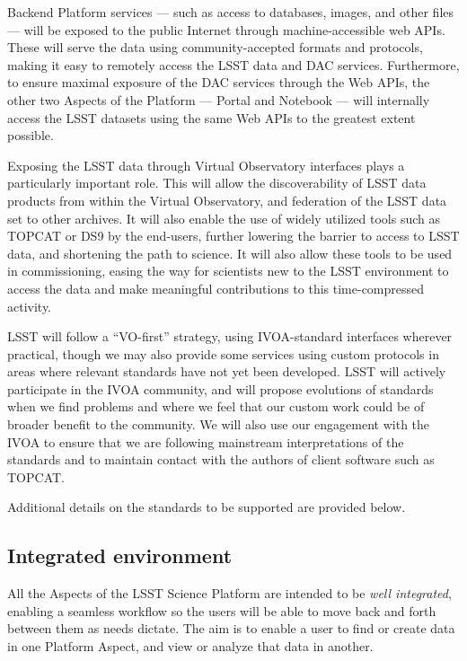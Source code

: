 Backend Platform services --- such as access to
databases, images, and other files --- will be exposed to the public Internet through
machine-accessible web APIs.
These will serve the data using community-accepted
formats and protocols, making it easy to remotely access the LSST data and DAC	
services.
Furthermore, to ensure maximal exposure of the DAC services through the Web APIs,
the other two Aspects of the Platform --- Portal and Notebook --- will
internally access the LSST datasets using the same Web APIs to the greatest extent possible.

Exposing the LSST data through Virtual Observatory interfaces plays a particularly important role.
This will allow the discoverability of LSST data products from within the Virtual Observatory,
and federation of the LSST data set to other archives.
It will also enable the use of widely utilized tools such as TOPCAT or DS9 by the end-users,
further lowering the barrier to access to LSST data, and shortening the path to science.
It will also allow these tools to be used in commissioning,
easing the way for scientists new to the LSST environment to access the data and make meaningful
contributions to this time-compressed activity.

LSST will follow a ``VO-first'' strategy, using IVOA-standard interfaces wherever practical,
though we may also provide some services using custom protocols in areas where relevant standards have not yet been developed.
LSST will actively participate in the IVOA community, and will propose evolutions of standards when we find problems and where we feel that our custom work could be of broader benefit to the community.
We will also use our engagement with the IVOA to ensure that we are following mainstream interpretations of the standards and to maintain contact with the authors of client software such as TOPCAT.

Additional details on the standards to be supported are provided below.

\subsection{Integrated environment}

All the Aspects of the LSST Science Platform are intended to be \emph{well integrated}, enabling a seamless workflow so the users will be able to move back and forth between them as needs dictate.
The aim is to enable a user to find or create data in one Platform Aspect, and view or analyze that data in another.


